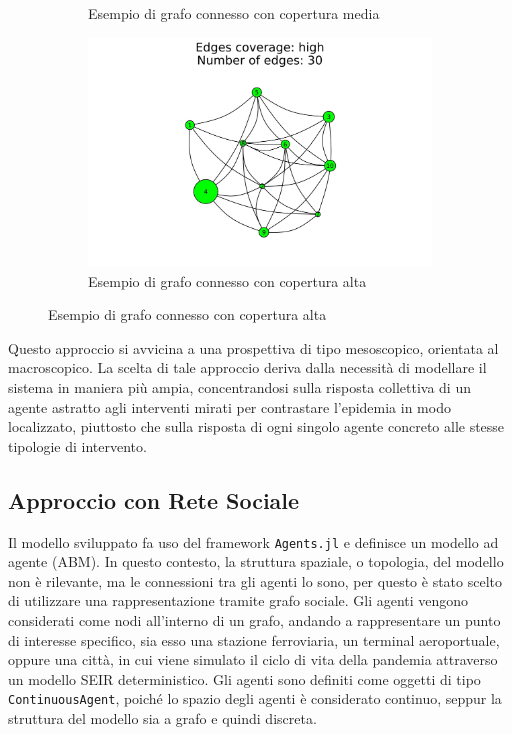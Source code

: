 \begin{figure}[H]
\begin{subfigure}[b]{0.3\textwidth}
		\caption{Esempio di grafo connesso con copertura media}
		\label{fig:connected_graph_example_medium}
	\end{subfigure}
	\hfill
	\begin{subfigure}[b]{0.3\textwidth}
		\centering
		\includegraphics[width=\textwidth]{img/high.jpg}
		\caption{Esempio di grafo connesso con copertura alta}
		\label{fig:connected_graph_example_high}
	\end{subfigure}
\end{figure}

Questo approccio si avvicina a una prospettiva di tipo mesoscopico, 
orientata al macroscopico. La scelta di tale approccio deriva dalla 
necessità di modellare il sistema in maniera più ampia, concentrandosi 
sulla risposta collettiva di un agente astratto agli interventi mirati 
per contrastare l'epidemia in modo localizzato, piuttosto che sulla risposta
di ogni singolo agente concreto alle stesse tipologie di intervento.

\subsection{Approccio con Rete Sociale}

Il modello sviluppato fa uso del framework \texttt{Agents.jl} \cite{Agents.jl} e 
definisce un modello ad agente (ABM). In questo contesto, la struttura 
spaziale, o topologia, del modello non è rilevante, ma le connessioni tra gli agenti 
lo sono, per questo è  stato scelto di utilizzare una rappresentazione tramite 
grafo sociale. Gli agenti vengono considerati come nodi all'interno di un grafo,
andando a rappresentare un punto di interesse specifico, sia esso 
una stazione ferroviaria, un terminal aeroportuale, oppure una città,
in cui viene simulato il ciclo di vita della pandemia attraverso un 
modello SEIR deterministico. Gli agenti sono definiti come oggetti di tipo 
\texttt{ContinuousAgent}, poiché lo spazio degli agenti è considerato continuo,
seppur la struttura del modello sia a grafo e quindi discreta.

